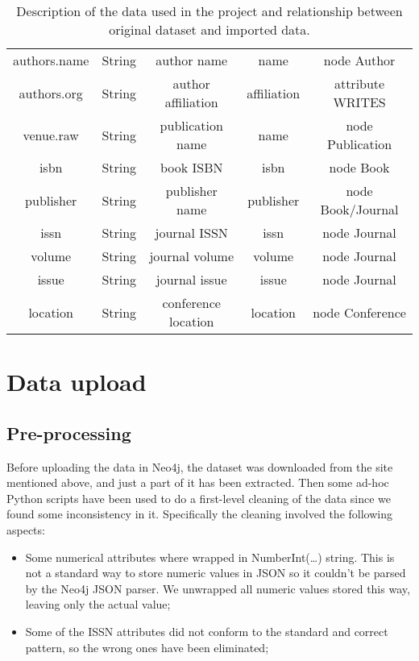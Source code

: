 \begin{table}[H]
\begin{center}
\begin{tabular}{|c|c|c|c|c|}
            authors.name        & String        & author name          & name                   & node Author\T\B             \\
            authors.org         & String        & author affiliation   & affiliation            & attribute WRITES\T\B        \\
            venue.raw           & String        & publication name     & name                   & node Publication \T\B       \\
            isbn                & String        & book ISBN            & isbn                   & node Book \T\B              \\
            publisher           & String        & publisher name       & publisher              & node Book/Journal \T\B      \\
            issn                & String        & journal ISSN         & issn                   & node Journal \T\B           \\
            volume              & String        & journal volume       & volume                 & node Journal \T\B           \\
            issue               & String        & journal issue        & issue                  & node Journal \T\B           \\
            location            & String        & conference location  & location               & node Conference \T\B        \\
            \hline
        \end{tabular}
        \caption{Description of the data used in the project and relationship between original dataset and imported data.}
        \label{tab:table1}%
    \end{center}
\end{table}


\chapter{Data upload}
\label{ch:data_upload_neo4j}%


\section{Pre-processing}
\label{sec:pre_processing_neo4j}%
Before uploading the data in Neo4j, the dataset was downloaded from the site mentioned above, and just a part of it has been extracted.
Then some ad-hoc Python scripts have been used to do a first-level cleaning of the data since we found some inconsistency in it.
Specifically the cleaning involved the following aspects:
\begin{itemize}
    \item Some numerical attributes where wrapped in NumberInt(\ldots) string.
    This is not a standard way to store numeric values in JSON so it couldn't be parsed by the Neo4j JSON parser.
    We unwrapped all numeric values stored this way, leaving only the actual value;
    \item Some of the ISSN attributes did not conform to the standard and correct pattern, so the wrong ones have been eliminated;
\end{itemize}

